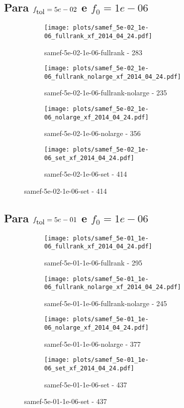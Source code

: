 \newpage
\subsection{Para $f_{\mbox{tol}} = 5e-02$ e $f_0 = 1e-06$}

\begin{figure}[H]
  \centering
  \begin{subfigure}{0.48\textwidth}
    \texttt{[image: plots/samef\_5e-02\_1e-06\_fullrank\_xf\_2014\_04\_24.pdf]}
    \caption{samef-5e-02-1e-06-fullrank - 283}
  \end{subfigure}
  \begin{subfigure}{0.48\textwidth}
    \texttt{[image: plots/samef\_5e-02\_1e-06\_fullrank\_nolarge\_xf\_2014\_04\_24.pdf]}
    \caption{samef-5e-02-1e-06-fullrank-nolarge - 235}
  \end{subfigure}
  \begin{subfigure}{0.48\textwidth}
    \texttt{[image: plots/samef\_5e-02\_1e-06\_nolarge\_xf\_2014\_04\_24.pdf]}
    \caption{samef-5e-02-1e-06-nolarge - 356}
  \end{subfigure}
  \begin{subfigure}{0.48\textwidth}
    \texttt{[image: plots/samef\_5e-02\_1e-06\_set\_xf\_2014\_04\_24.pdf]}
    \caption{samef-5e-02-1e-06-set - 414}
  \end{subfigure}
\end{figure}

\newpage
\subsection{Para $f_{\mbox{tol}} = 5e-01$ e $f_0 = 1e-06$}

\begin{figure}[H]
  \centering
  \begin{subfigure}{0.48\textwidth}
    \texttt{[image: plots/samef\_5e-01\_1e-06\_fullrank\_xf\_2014\_04\_24.pdf]}
    \caption{samef-5e-01-1e-06-fullrank - 295}
  \end{subfigure}
  \begin{subfigure}{0.48\textwidth}
    \texttt{[image: plots/samef\_5e-01\_1e-06\_fullrank\_nolarge\_xf\_2014\_04\_24.pdf]}
    \caption{samef-5e-01-1e-06-fullrank-nolarge - 245}
  \end{subfigure}
  \begin{subfigure}{0.48\textwidth}
    \texttt{[image: plots/samef\_5e-01\_1e-06\_nolarge\_xf\_2014\_04\_24.pdf]}
    \caption{samef-5e-01-1e-06-nolarge - 377}
  \end{subfigure}
  \begin{subfigure}{0.48\textwidth}
    \texttt{[image: plots/samef\_5e-01\_1e-06\_set\_xf\_2014\_04\_24.pdf]}
    \caption{samef-5e-01-1e-06-set - 437}
  \end{subfigure}
\end{figure}

